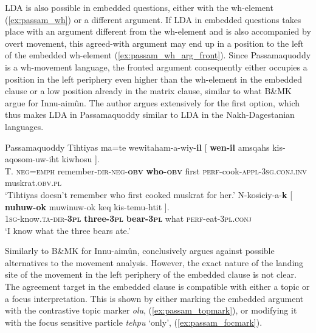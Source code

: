 \documentclass[output=paper
,modfonts
,nonflat]{langsci/langscibook}
\begin{document}
LDA is also possible in embedded questions, either with the wh-element (\ref{ex:passam_wh}) or a different argument. If LDA in embedded questions takes place with an argument different from the wh-element and is also accompanied by overt movement, this agreed-with argument may end up in a position to the left of the embedded wh-element  (\ref{ex:passam_wh_arg_front}). Since Passamaquoddy is a wh-movement language, the fronted argument consequently either occupies a position in the left periphery even higher than the wh-element in the embedded clause or a low position already in the matrix clause, similar to what B\&MK argue for Innu-aim\^{u}n. The author argues extensively for the first option, which thus makes LDA in Passamaquoddy similar to LDA in the Nakh-Dagestanian languages.
\begin{exe}
\ex Passamaquoddy \citep[][259]{Bruening2001a}
	\xlist
	\ex \label{ex:passam_wh}	
		\gll Tihtiyas ma=te wewitaham-a-wiy-\textbf{il} [ \textbf{wen-il} amsqahs kis-aqosom-uw-iht kiwhosu ].\\
			 T. \textsc{neg=emph} remember-\textsc{dir-neg-\textbf{obv}} {} \textbf{who-\textsc{obv}} first \textsc{perf}-cook-\textsc{appl-3sg.conj.inv} muskrat.\textsc{obv.pl}\\
		\glt `Tihtiyas doesn't remember who first cooked muskrat for her.'
	\ex \label{ex:passam_wh_arg_front}
		\gll N-kosiciy-a-\textbf{k} [ \textbf{nuhuw-ok} muwinuw-ok keq  kis-temu-htit ].\\
			 \textsc{1sg}-know.\textsc{ta-dir-\textbf{3pl}} {} \textbf{three-\textsc{3pl}} \textbf{bear-\textsc{3pl}} what \textsc{perf-}eat\textsc{-3pl.conj}\\
		\glt `I know what the three bears ate.' 
	\endxlist
\end{exe}
Similarly to B\&MK for Innu-aim\^{u}n, \citet{Bruening2001a} conclusively argues against possible alternatives to the movement analysis. However, the exact nature of the landing site of the movement in the left periphery of the embedded clause is not clear. The agreement target in the embedded clause is compatible with either a topic or a focus interpretation. This is shown by either marking the embedded argument with the contrastive topic marker \textit{olu}, (\ref{ex:passam_topmark}), or modifying it with the focus sensitive particle \textit{tehpu} `only', (\ref{ex:passam_focmark}).
\end{document}
